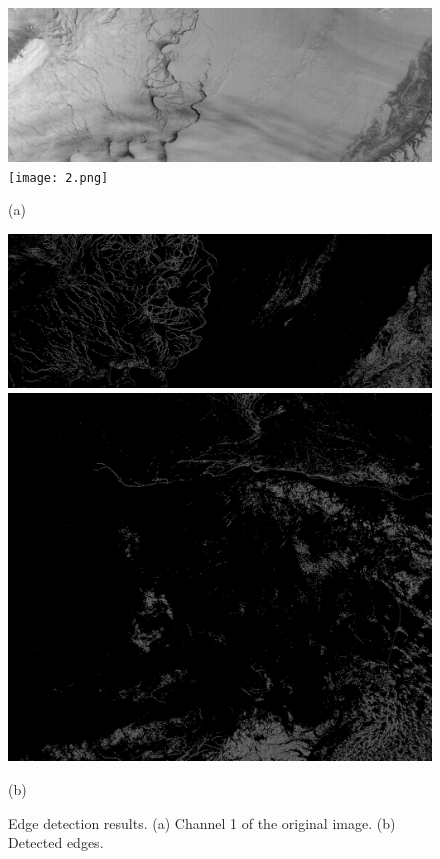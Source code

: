 \documentclass{article}
\begin{document}
        \begin{figure}[ht]
            \centering
            \begin{minipage}{0.49\hsize}
                \centering
                \includegraphics[width = 1\hsize]{1.png}
                \texttt{[image: 2.png]}
                \caption*{(a)}
            \end{minipage}
            \begin{minipage}{0.49\hsize}
                \centering
                \includegraphics[width = 1\hsize]{1_edge.png}
                \includegraphics[width = 1\hsize]{2_edge.png}
                \caption*{(b)}
            \end{minipage}
            \caption{
                Edge detection results.
                (a) Channel 1 of the original image.
                (b) Detected edges.
            }
            \label{fig:edge}
        \end{figure}
\end{document}
